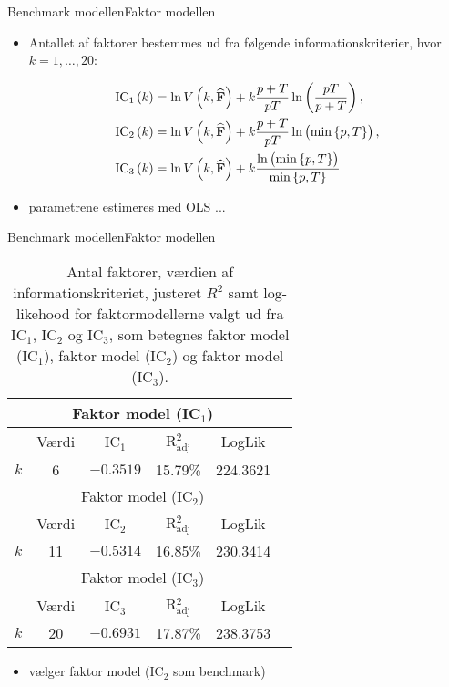 \begin{frame}{Benchmark modellen}{Faktor modellen}
\begin{itemize}
\item Antallet af faktorer bestemmes ud fra følgende informationskriterier, hvor \(k = 1, \ldots, 20\):
\begin{small}
\begin{align*}
\text{IC}_1 \del{k} &= \ln V \del{k, \widehat{\mathbf{F}}} + k \frac{p + T}{p T} \ln \del{\frac{p T}{p + T}}, \\
\text{IC}_2 \del{k} &= \ln V \del{k, \widehat{\mathbf{F}}} + k \frac{p + T}{p T} \ln \del{ \min \cbr{p, T}}, \\
\text{IC}_3 \del{k} &= \ln V \del{k, \widehat{\mathbf{F}}} + k \frac{\ln \del{\min \cbr{p, T}}}{\min \cbr{p, T}}
\end{align*}
\end{small}

\item parametrene estimeres med OLS ...
\end{itemize}

\end{frame}

\begin{frame}{Benchmark modellen}{Faktor modellen}
\begin{table}[h]
\center
\begin{tabular}{lccccc}
\toprule
\multicolumn{5}{c}{Faktor model (IC$_1$)} \\ \midrule
& Værdi &  IC$_1$ &  R$^2_{\text{adj}}$ & LogLik  \\
$k$ & 6 &  $-0.3519$ &  15.79\% &  224.3621  \\ \bottomrule \toprule
\multicolumn{5}{c}{Faktor model (IC$_2$)} \\ \midrule
 & Værdi &  IC$_2$ &  R$^2_{\text{adj}}$ & LogLik \\
 $k$ &11 & $-0.5314$ &  16.85\% &  230.3414 \\\bottomrule \toprule
\multicolumn{5}{c}{Faktor model (IC$_3$)} \\ \midrule
& Værdi &  IC$_3$ &  R$^2_{\text{adj}}$ & LogLik\\
$k$ & 20 & $-0.6931$ & 17.87\% & 238.3753 \\  \bottomrule
 \end{tabular}
 \caption{Antal faktorer, værdien af informationskriteriet, justeret \(R^2\) samt log-likehood for faktormodellerne valgt ud fra IC$_1$, IC$_2$ og IC$_3$, som betegnes faktor model (IC\(_1\)), faktor model (IC\(_2\)) og faktor model (IC\(_3\)).} \label{tab:est_faktor}
\end{table}
\begin{itemize}
\item vælger faktor model (IC\(_2\) som benchmark)
\end{itemize}
\end{frame}

